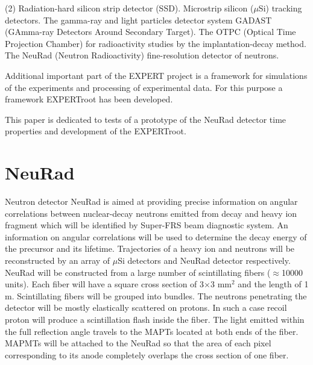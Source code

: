 \documentclass{webofc}
\begin{document}
\begin{tasks}(2)
	\task Radiation-hard silicon strip detector (SSD).
	\task Microstrip silicon ($\mu$Si) tracking detectors.
	\task The gamma-ray and light particles detector system GADAST (GAmma-ray Detectors Around Secondary Target).
	\task The OTPC (Optical Time Projection Chamber) for radioactivity studies by the implantation-decay method.
	\task The NeuRad (Neutron Radioactivity) fine-resolution detector of neutrons.
\end{tasks}

Additional important part of the EXPERT project is a framework for simulations of the experiments and processing of experimental data. For this purpose a framework EXPERTroot \cite{er} has been developed. %

This paper is dedicated to tests of a prototype of the NeuRad detector time properties and development of the EXPERTroot.

\section{NeuRad}
Neutron detector NeuRad is aimed at providing precise information on angular correlations between nuclear-decay neutrons emitted from decay and heavy ion fragment which will be identified by Super-FRS beam diagnostic system. An information on angular correlations will be used to determine the decay energy of the precursor and its lifetime. Trajectories of a heavy ion and neutrons will be reconstructed by an array of $\mu$Si detectors and NeuRad detector respectively. %
NeuRad will be constructed from a large number of scintillating fibers ($\approx$10000 units). Each fiber will have a square cross section of 3$\times$3 mm$^2$ and the length of 1 m. Scintillating fibers will be grouped into bundles. 
The neutrons penetrating the detector will be mostly elastically scattered on protons. In such a case recoil proton will produce a scintillation flash inside the fiber. The light emitted within the full reflection angle travels to the MAPTs located at both ends of the fiber.
MAPMTs will be attached to the NeuRad so that the area of each pixel corresponding to its anode completely overlaps the cross section of one fiber.
\end{document}
